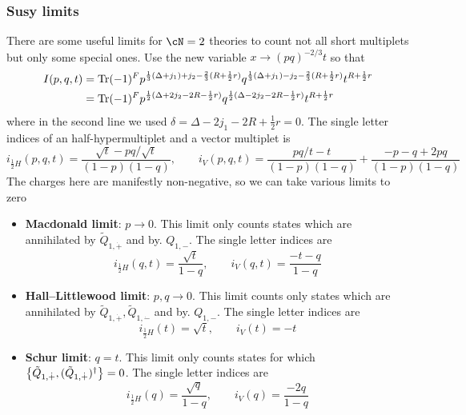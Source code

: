 \documentclass[11pt]{article}
\theoremstyle{definition}
\numberwithin{equation}{section}
\begin{document}
\subsubsection{Susy limits}
There are some useful limits for $\cN=2$ theories to count not all short multiplets but only some special ones. Use the new variable $x\rightarrow (pq)^{-2/3}t$ so that
\begin{equation}
\begin{split}
	I(p,q,t)&=\operatorname{Tr} (-1)^{F}p^{\frac{1}{3}(\Delta+j_{1})+j_{2}-\frac{2}{3} (R+\frac{1}{2} r)}q^{\frac{1}{3}(\Delta+j_{1})-j_{2}-\frac{2}{3}(R+\frac{1}{2}r)}t^{R+\frac{1}{2}r}\\
	&=\operatorname{Tr} (-1)^{F}p^{\frac{1}{2}(\Delta+2j_{2}-2R-\frac{1}{2}r)}q^{\frac{1}{2}(\Delta-2j_{2}-2R-\frac{1}{2}r)}t^{R+\frac{1}{2}r}
\end{split}
\end{equation}
where in the second line we used $\delta=\Delta-2j_{1}-2R+\frac{1}{2}r=0$. The single letter indices of an half-hypermultiplet and a vector multiplet is
\begin{equation}
	i_{\frac{1}{2}H}(p,q,t)=\frac{\sqrt{t}-pq/\sqrt{t}}{(1-p)(1-q)},\qquad i_{V}(p,q,t)=\frac{pq/t-t}{(1-p)(1-q)}+\frac{-p-q+2pq}{(1-p)(1-q)}
\end{equation}
The charges here are manifestly non-negative, so we can take various limits to zero
\begin{itemize}
	\item \textbf{Macdonald limit}: $p\rightarrow 0$. This limit only counts states which are annihilated by $\tilde Q_{1,\dot{+}}$ and by. $Q_{1,-}$. The single letter indices are
	\begin{equation}
		i_{\frac{1}{2}H}(q,t)=\frac{\sqrt{t}}{1-q},\qquad i_{V}(q,t)=\frac{-t-q}{1-q}
	\end{equation}
	\item \textbf{Hall--Littlewood limit}: $p,q\rightarrow0$. This limit counts only states which are annihilated by $\tilde Q_{1,\dot{+}},\tilde{Q}_{1,\dot{-}}$ and by. $Q_{1,-}$. The single letter indices are
	\begin{equation}
		i_{\frac{1}{2}H}(t)=\sqrt{t},\qquad i_{V}(t)=-t
	\end{equation}
	\item \textbf{Schur limit}: $q=t$. This limit only counts states for which $\acomm{\tilde{Q}_{1,\dot{+}}}{(\tilde{Q}_{1,\dot{+}})^{\dagger}}=0$. The single letter indices are
	\begin{equation}
		i_{\frac{1}{2}H}(q)=\frac{\sqrt{q}}{1-q},\qquad i_{V}(q)=\frac{-2q}{1-q}
	\end{equation}
\end{itemize}
\end{document}
